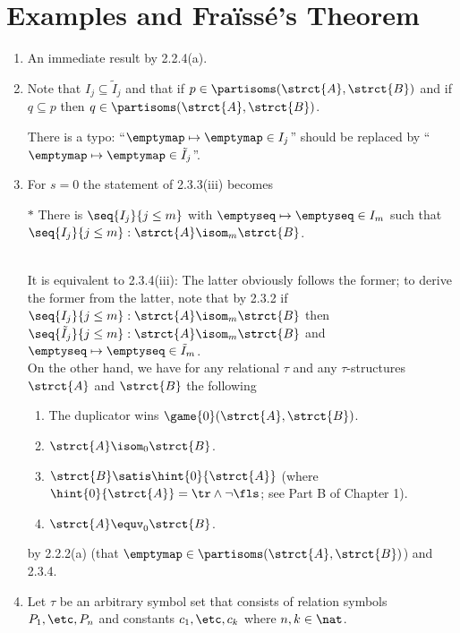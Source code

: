 \section{Examples and Fra\"{i}ss\'{e}'s Theorem}
\begin{enumerate}[1.]
%
\item {} An immediate result by 2.2.4(a).
%
\item {} Note that $I_j \subseteq \tilde{I}_j$ and that if $p \in \partisoms(\strct{A}, \strct{B})$ and if $q \subseteq p$ then $q \in \partisoms(\strct{A}, \strct{B})$.
\begin{remark}
There is a typo: ``$\emptymap \mapsto \emptymap \in I_j$'' should be replaced by ``$\emptymap \mapsto \emptymap \in \tilde{I}_j$''.
\end{remark}
%
\item {} For $s = 0$ the statement of 2.3.3(iii) becomes
\medskip\\
\begin{quoteno}{$\ast$}
There is $\seq{I_j}{j \leq m}$ with $\emptyseq \mapsto \emptyseq \in I_m$ such that $\seq{I_j}{j \leq m} : \strct{A} \isom_m \strct{B}$.
\end{quoteno}
\medskip\\
It is equivalent to 2.3.4(iii): The latter obviously follows the former; to derive the former from the latter, note that by 2.3.2 if $\seq{I_j}{j \leq m} : \strct{A} \isom_m \strct{B}$ then $\seq{\tilde{I}_j}{j \leq m} : \strct{A} \isom_m \strct{B}$ and $\emptyseq \mapsto \emptyseq \in \tilde{I}_m$.
\medskip\\
On the other hand, we have for any relational $\tau$ and any $\tau$-structures $\strct{A}$ and $\strct{B}$ the following
\begin{enumerate}[(1)]
\item The duplicator wins $\game{0}(\strct{A}, \strct{B})$.
\item $\strct{A} \isom_0 \strct{B}$.
\item $\strct{B} \satis \hint{0}{\strct{A}}$ (where $\hint{0}{\strct{A}} = \tr \land \neg\fls$; see Part B of Chapter 1).
\item $\strct{A} \equv_0 \strct{B}$.
\end{enumerate}
by 2.2.2(a) (that $\emptymap \in \partisoms(\strct{A}, \strct{B})$) and 2.3.4.
%
\item {} Let $\tau$ be an arbitrary symbol set that consists of relation symbols $P_1, \etc, P_n$ and constants $c_1, \etc, c_k$ where $n, k \in \nat$.

\end{enumerate}
